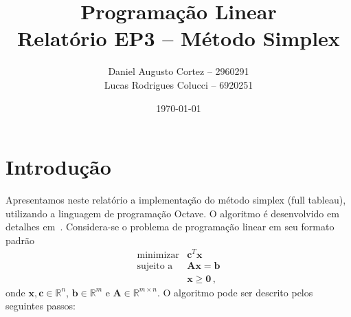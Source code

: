 \documentclass[12pt,a4paper]{article}
\newcommand{\vet}{\mathbf}                                   %
\newcommand{\zerar}{\setcounter{equation}{0}\setcounter{figure}{0}\setcounter{table}{0}}
\newcommand{\R}{\mathbb{R}}
\begin{document}
\title{Programação Linear \\ Relatório EP3 -- Método Simplex}
\author{Daniel Augusto Cortez -- 2960291 \\ Lucas Rodrigues Colucci -- 6920251}
\date{\today}

\maketitle


\zerar
\section{Introdução}
\label{sec:introducao}

Apresentamos neste relatório a implementação do método simplex (full tableau), utilizando a 
linguagem de programação Octave. O algoritmo é desenvolvido em detalhes em~\cite{bertsimas}.
Considera-se o problema de programação linear em seu formato padrão
%
\begin{equation*}
	\begin{array}{rl}
		\text{minimizar} & \vet{c}^T \vet{x} \\
		\text{sujeito a} & \vet{A} \vet{x} = \vet{b} \\\
		                 & \vet{x} \geq \vet{0} \, ,
	 \end{array}
\end{equation*}
%
onde $\vet{x}, \vet{c} \in \R^n$, $\vet{b} \in \R^m$ e $\vet{A} \in \R^{m \times n}$. 
O algoritmo pode ser descrito pelos seguintes passos:

\vspace{0.5cm}
\end{document}
